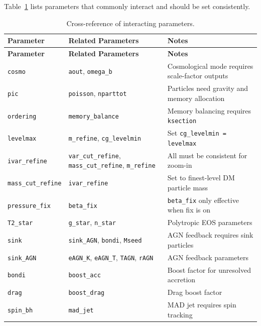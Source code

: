 Table~\ref{tab:crossref} lists parameters that commonly interact and
should be set consistently.

\begin{longtable}{@{}p{4cm}p{4.5cm}p{6.5cm}@{}}
\caption{Cross-reference of interacting parameters.}
\label{tab:crossref}\\
\toprule
\textbf{Parameter} & \textbf{Related Parameters} & \textbf{Notes} \\
\midrule
\endfirsthead
\toprule
\textbf{Parameter} & \textbf{Related Parameters} & \textbf{Notes} \\
\midrule
\endhead
\bottomrule
\endfoot
\texttt{cosmo}
  & \texttt{aout}, \texttt{omega\_b}
  & Cosmological mode requires scale-factor outputs \\
\addlinespace
\texttt{pic}
  & \texttt{poisson}, \texttt{nparttot}
  & Particles need gravity and memory allocation \\
\addlinespace
\texttt{ordering}
  & \texttt{memory\_balance}
  & Memory balancing requires \texttt{ksection} \\
\addlinespace
\texttt{levelmax}
  & \texttt{m\_refine}, \texttt{cg\_levelmin}
  & Set \texttt{cg\_levelmin = levelmax} \\
\addlinespace
\texttt{ivar\_refine}
  & \texttt{var\_cut\_refine}, \texttt{mass\_cut\_refine}, \texttt{m\_refine}
  & All must be consistent for zoom-in \\
\addlinespace
\texttt{mass\_cut\_refine}
  & \texttt{ivar\_refine}
  & Set to finest-level DM particle mass \\
\addlinespace
\texttt{pressure\_fix}
  & \texttt{beta\_fix}
  & \texttt{beta\_fix} only effective when fix is on \\
\addlinespace
\texttt{T2\_star}
  & \texttt{g\_star}, \texttt{n\_star}
  & Polytropic EOS parameters \\
\addlinespace
\texttt{sink}
  & \texttt{sink\_AGN}, \texttt{bondi}, \texttt{Mseed}
  & AGN feedback requires sink particles \\
\addlinespace
\texttt{sink\_AGN}
  & \texttt{eAGN\_K}, \texttt{eAGN\_T}, \texttt{TAGN}, \texttt{rAGN}
  & AGN feedback parameters \\
\addlinespace
\texttt{bondi}
  & \texttt{boost\_acc}
  & Boost factor for unresolved accretion \\
\addlinespace
\texttt{drag}
  & \texttt{boost\_drag}
  & Drag boost factor \\
\addlinespace
\texttt{spin\_bh}
  & \texttt{mad\_jet}
  & MAD jet requires spin tracking \\

\end{longtable}
